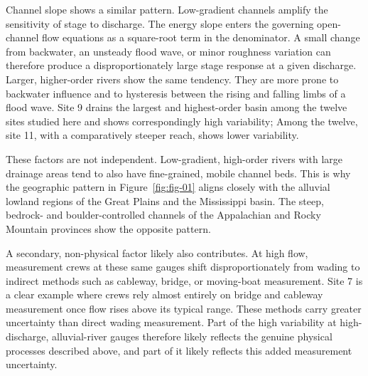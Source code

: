 \documentclass[11pt]{article}
\begin{document}
Channel slope shows a similar pattern. Low-gradient channels amplify the sensitivity of stage to discharge. The energy slope enters the governing open-channel flow equations as a square-root term in the denominator. A small change from backwater, an unsteady flood wave, or minor roughness variation can therefore produce a disproportionately large stage response at a given discharge. Larger, higher-order rivers show the same tendency. They are more prone to backwater influence and to hysteresis between the rising and falling limbs of a flood wave. Site 9 drains the largest and highest-order basin among the twelve sites studied here and shows correspondingly high variability; Among the twelve, site 11, with a comparatively steeper reach, shows lower variability.

These factors are not independent. Low-gradient, high-order rivers with large drainage areas tend to also have fine-grained, mobile channel beds. This is why the geographic pattern in Figure~\ref{fig:fig-01} aligns closely with the alluvial lowland regions of the Great Plains and the Mississippi basin. The steep, bedrock- and boulder-controlled channels of the Appalachian and Rocky Mountain provinces show the opposite pattern.

A secondary, non-physical factor likely also contributes. At high flow, measurement crews at these same gauges shift disproportionately from wading to indirect methods such as cableway, bridge, or moving-boat measurement. Site 7 is a clear example where crews rely almost entirely on bridge and cableway measurement once flow rises above its typical range. These methods carry greater uncertainty than direct wading measurement. Part of the high variability at high-discharge, alluvial-river gauges therefore likely reflects the genuine physical processes described above, and part of it likely reflects this added measurement uncertainty. %
\end{document}
